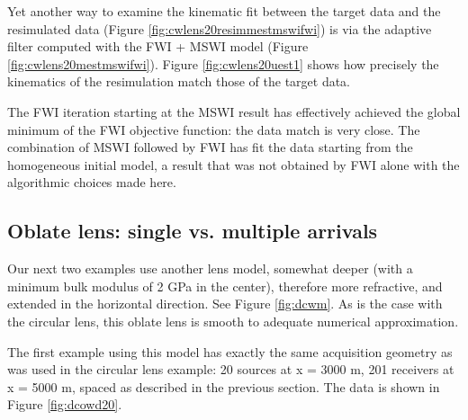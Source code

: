 

Yet another way to examine the kinematic fit between the target data
and the resimulated data (Figure \ref{fig:cwlens20resimmestmswifwi})
is via the adaptive filter computed with the FWI + MSWI model (Figure
\ref{fig:cwlens20mestmswifwi}).  Figure \ref{fig:cwlens20uest1}
shows how precisely the kinematics of the resimulation match those of
the target data.


The FWI iteration starting at the MSWI result has effectively achieved
the global minimum of the FWI objective function: the data match is
very close. The combination of MSWI followed by FWI has fit the data
starting from the homogeneous initial model, a result that was not obtained
by FWI alone with the algorithmic choices made here.

\subsection{Oblate lens: single vs. multiple arrivals}

Our next two examples use another lens model, somewhat deeper (with a
minimum bulk modulus of 2 GPa in the center), therefore more
refractive, and extended in the
horizontal direction. See Figure \ref{fig:dcwm}. As is the case with
the circular lens, this oblate lens is smooth to adequate numerical
approximation.


The first example using this model has exactly the same acquisition
geometry as was used in the circular lens example: 20 sources at x =
3000 m, 201 receivers at x = 5000 m, spaced as described in the
previous section. The data is shown in Figure \ref{fig:dcowd20}. 

